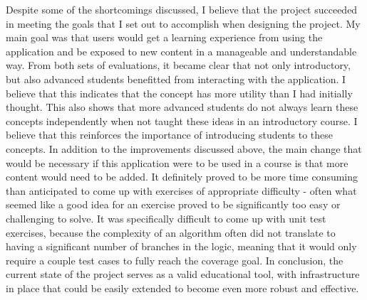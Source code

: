 \documentclass[10pt,twocolumn]{article}
\begin{document}
Despite some of the shortcomings discussed, I believe that the project succeeded in meeting the goals that I set out to 
accomplish when designing the project. My main goal was that users would get a learning experience from using the 
application and be exposed to new content in a manageable and understandable way. From both sets of evaluations, it 
became clear that not only introductory, but also advanced students benefitted from interacting with the application. 
I believe that this indicates that the concept has more utility than I had initially thought. This also shows that 
more advanced students do not always learn these concepts independently when not taught these ideas 
in an introductory course. I believe that this reinforces the importance of introducing students to these concepts. 
In addition to the improvements discussed above, the main change that would be necessary if this application were to be 
used in a course is that more content would need to be added. It definitely proved to be more time consuming than anticipated 
to come up with exercises of appropriate difficulty - often what seemed like a good idea for an exercise proved to be 
significantly too easy or challenging to solve. It was specifically difficult to come up with unit test exercises, because the 
complexity of an algorithm often did not translate to having a significant number of branches in the logic, 
meaning that it would only require a couple test cases to fully reach the coverage goal. In conclusion, the current state 
of the project serves as a valid educational tool, with infrastructure in place that could be easily extended to become 
even more robust and effective. 


\printbibliography 
\end{document}
